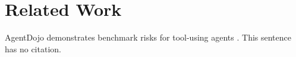 \section{Related Work}
AgentDojo demonstrates benchmark risks for tool-using agents \cite{debenedetti2024agentdojo}.
This sentence has no citation.
